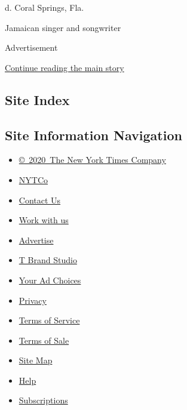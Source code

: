 d. Coral Springs, Fla.

Jamaican singer and songwriter

Advertisement

\protect\hyperlink{after-bottom}{Continue reading the main story}

\hypertarget{site-index}{%
\subsection{Site Index}\label{site-index}}

\hypertarget{site-information-navigation}{%
\subsection{Site Information
Navigation}\label{site-information-navigation}}

\begin{itemize}
\tightlist
\item
  \href{https://help.nytimes3xbfgragh.onion/hc/en-us/articles/115014792127-Copyright-notice}{©~2020~The
  New York Times Company}
\end{itemize}

\begin{itemize}
\tightlist
\item
  \href{https://www.nytco.com/}{NYTCo}
\item
  \href{https://help.nytimes3xbfgragh.onion/hc/en-us/articles/115015385887-Contact-Us}{Contact
  Us}
\item
  \href{https://www.nytco.com/careers/}{Work with us}
\item
  \href{https://nytmediakit.com/}{Advertise}
\item
  \href{http://www.tbrandstudio.com/}{T Brand Studio}
\item
  \href{https://www.nytimes3xbfgragh.onion/privacy/cookie-policy\#how-do-i-manage-trackers}{Your
  Ad Choices}
\item
  \href{https://www.nytimes3xbfgragh.onion/privacy}{Privacy}
\item
  \href{https://help.nytimes3xbfgragh.onion/hc/en-us/articles/115014893428-Terms-of-service}{Terms
  of Service}
\item
  \href{https://help.nytimes3xbfgragh.onion/hc/en-us/articles/115014893968-Terms-of-sale}{Terms
  of Sale}
\item
  \href{https://spiderbites.nytimes3xbfgragh.onion}{Site Map}
\item
  \href{https://help.nytimes3xbfgragh.onion/hc/en-us}{Help}
\item
  \href{https://www.nytimes3xbfgragh.onion/subscription?campaignId=37WXW}{Subscriptions}
\end{itemize}

